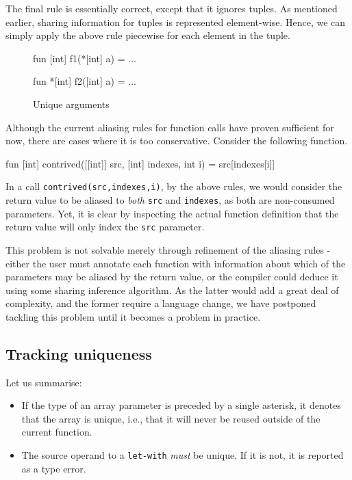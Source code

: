 \documentclass[oneside]{memoir}
\begin{document}
The final rule is essentially correct, except that it ignores tuples.
As mentioned earlier, sharing information for tuples is represented
element-wise.  Hence, we can simply apply the above rule piecewise for
each element in the tuple.

\begin{figure}
\begin{center}
\begin{colorcode}
fun [int] f1(*[int] a) = ...

fun *[int] f2([int] a) = ...
\end{colorcode}
\end{center}
\caption{Unique arguments}
\label{fig:unique-arguments}
\end{figure}

Although the current aliasing rules for function calls have proven
sufficient for now, there are cases where it is too conservative.
Consider the following function.

\begin{colorcode}
fun [int] contrived([[int]] src, [int] indexes, int i) =
  src[indexes[i]]
\end{colorcode}

In a call \texttt{contrived(src,indexes,i)}, by the above rules, we
would consider the return value to be aliased to \textit{both}
\texttt{src} and \texttt{indexes}, as both are non-consumed
parameters.  Yet, it is clear by inspecting the actual function
definition that the return value will only index the \texttt{src}
parameter.

This problem is not solvable merely through refinement of the aliasing
rules - either the user must annotate each function with information
about which of the parameters may be aliased by the return value, or
the compiler could deduce it using some sharing inference algorithm.
As the latter would add a great deal of complexity, and the former
require a language change, we have postponed tackling this problem
until it becomes a problem in practice.

\subsection{Tracking uniqueness}
\label{sec:futhark-tracking-uniqueness}

Let us summarise:

\begin{itemize}
\item If the type of an array parameter is preceded by a single
  asterisk, it denotes that the array is unique, i.e., that it will
  never be reused outside of the current function.

\item The source operand to a \texttt{let-with} \textit{must} be
  unique.  If it is not, it is reported as a type error.
\end{itemize}
\end{document}
